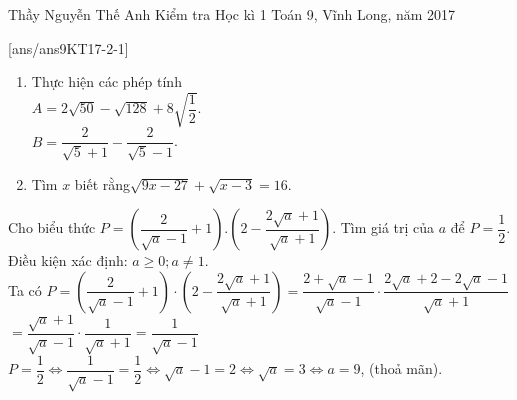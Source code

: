 \begin{name}
{Thầy  Nguyễn Thế Anh}
{Kiểm tra Học kì 1 Toán 9, Vĩnh Long, năm 2017}
\end{name}
[ans/ans9KT17-2-1]
\setcounter{ex}{0}

\begin{ex}%
	\hfill
    \begin{enumerate}
    	\item Thực hiện các phép tính\\
    		$A=2\sqrt{50}-\sqrt{128}+8\sqrt{\dfrac{1}{2}}$.	\\
    	   $B=\dfrac{2}{\sqrt{5}+1}-\dfrac{2}{\sqrt{5}-1}$.	
        \item Tìm $x$ biết rằng$\sqrt{9x-27}+\sqrt{x-3}=16$.
    \end{enumerate}
\end{ex}

\begin{ex}%
Cho biểu thức $P=\left(\dfrac{2}{\sqrt{a}-1}+1\right).\left(2-\dfrac{2\sqrt{a}+1}{\sqrt{a}+1}\right)$. Tìm giá trị của $a$ để $P=\dfrac{1}{2}$.
\loigiai
    {Điều kiện xác định: $a\ge 0;a\ne 1$.\\
    	Ta có $P=\left(\dfrac{2}{\sqrt{a}-1}+1\right)\cdot \left(2-\dfrac{2\sqrt{a}+1}{\sqrt{a}+1}\right)=\dfrac{2+\sqrt{a}-1}{\sqrt{a}-1}\cdot \dfrac{2\sqrt{a}+2-2\sqrt{a}-1}{\sqrt{a}+1}$\\
    	$=\dfrac{\sqrt{a}+1}{\sqrt{a}-1}\cdot \dfrac{1}{\sqrt{a}+1}=\dfrac{1}{\sqrt{a}-1}$\\
    	$P=\dfrac{1}{2}\Leftrightarrow \dfrac{1}{\sqrt{a}-1}=\dfrac{1}{2}\Leftrightarrow \sqrt{a}-1=2\Leftrightarrow \sqrt{a}=3\Leftrightarrow a=9$, (thoả mãn).
    }
\end{ex}


